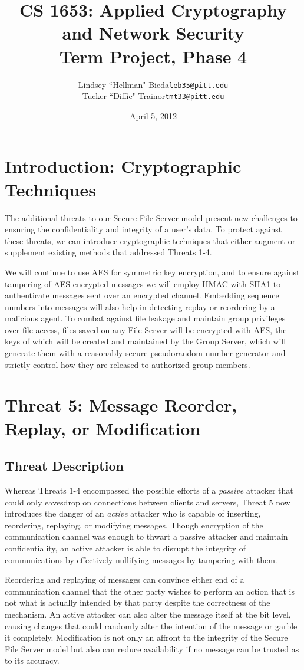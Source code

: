 \documentclass[11pt]{article}
\title{CS 1653: Applied Cryptography and Network Security\\Term Project, Phase 4}
\author{Lindsey ``Hellman" Bieda\quad\texttt{leb35@pitt.edu}\\Tucker ``Diffie" Trainor\quad\texttt{tmt33@pitt.edu}}
\date{April 5, 2012} %
\begin{document}
\maketitle
\section{Introduction: Cryptographic Techniques}
The additional threats to our Secure File Server model present new challenges to ensuring the confidentiality and integrity of a user's data. To protect against these threats, we can introduce cryptographic techniques that either augment or supplement existing methods that addressed Threats 1-4.

We will continue to use AES for symmetric key encryption, and to ensure against tampering of AES encrypted messages we will employ HMAC with SHA1 to authenticate messages sent over an encrypted channel. Embedding sequence numbers into messages will also help in detecting replay or reordering by a malicious agent. To combat against file leakage and maintain group privileges over file access, files saved on any File Server will be encrypted with AES, the keys of which will be created and maintained by the Group Server, which will generate them with a reasonably secure pseudorandom number generator and strictly control how they are released to authorized group members. 
\section{Threat 5: Message Reorder, Replay, or Modification}
\subsection{Threat Description}
Whereas Threats 1-4 encompassed the possible efforts of a \emph{passive} attacker that could only eavesdrop on connections between clients and servers, Threat 5 now introduces the danger of an \emph{active} attacker who is capable of inserting, reordering, replaying, or modifying messages. Though encryption of the communication channel was enough to thwart a passive attacker and maintain confidentiality, an active attacker is able to disrupt the integrity of communications by effectively nullifying messages by tampering with them.

Reordering and replaying of messages can convince either end of a communication channel that the other party wishes to perform an action that is not what is actually intended by that party despite the correctness of the mechanism. An active attacker can also alter the message itself at the bit level, causing changes that could randomly alter the intention of the message or garble it completely. Modification is not only an affront to the integrity of the Secure File Server model but also can reduce availability if no message can be trusted as to its accuracy.
\end{document}
